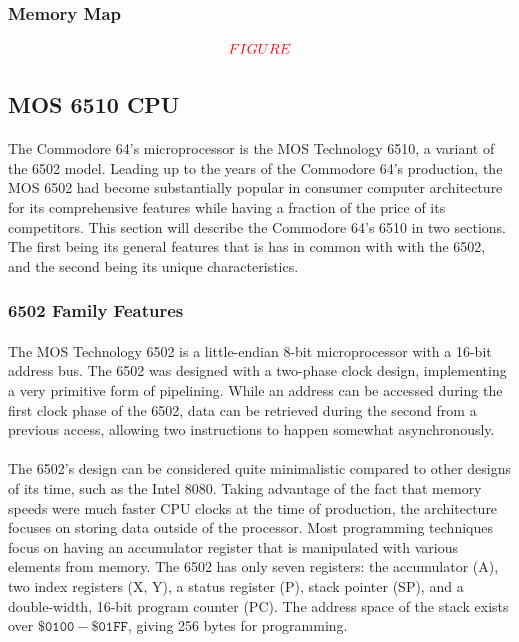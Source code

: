 \documentclass{article}
\begin{document}
\subsubsection{Memory Map}
\[\textcolor{red}{FIGURE}\]

\subsection{MOS 6510 CPU}
\paragraph{}
The Commodore 64's microprocessor is the MOS Technology 6510, a variant of the 6502 model. Leading up to the years of the Commodore 64's production, the MOS 6502 had become substantially popular in consumer computer architecture for its comprehensive features while having a fraction of the price of its competitors. This section will describe the Commodore 64's 6510 in two sections. The first being its general features that is has in common with with the 6502, and the second being its unique characteristics.

\subsubsection{6502 Family Features}

\paragraph{}
The MOS Technology 6502 is a little-endian 8-bit microprocessor with a 16-bit address bus. The 6502 was designed with a two-phase clock design, implementing a very primitive form of pipelining. While an address can be accessed during the first clock phase of the 6502, data can be retrieved during the second from a previous access, allowing two instructions to happen somewhat asynchronously. 

\paragraph{}
The 6502's design can be considered quite minimalistic compared to other designs of its time, such as the Intel 8080. Taking advantage of the fact that memory speeds were much faster CPU clocks at the time of production, the architecture focuses on storing data outside of the processor. Most programming techniques focus on having an accumulator register that is manipulated with various elements from memory. The 6502 has only seven registers: the accumulator (A), two index registers (X, Y), a status register (P), stack pointer (SP), and a double-width, 16-bit program counter (PC). The address space of the stack exists over $\mathtt{\$0100 - \$01FF}$, giving 256 bytes for programming. 
\end{document}
